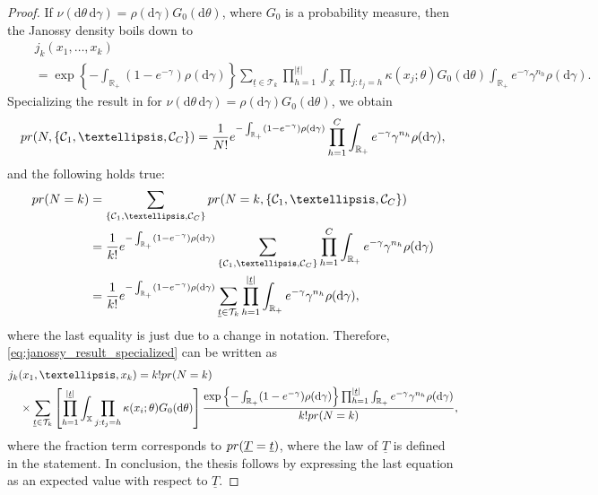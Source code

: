 \documentclass[10pt,a4paper]{amsart}
\newcommand{\R}{\mathbb{R}}
\newcommand{\X}{\mathbb{X}}
\newcommand{\calC}{\mathcal{C}}
\newcommand{\calT}{\mathcal{T}}
\newcommand{\dd}{\mathrm d}
\newcommand{\prob}{{\rm pr}}
\begin{document}
\begin{proof}
If $\nu(\dd \theta\, \dd \gamma) = \rho(\dd \gamma) G_0(\dd \theta)$, where $G_0$ is a probability measure, then the Janossy density boils down to
\begin{equation}\label{eq:janossy_result_specialized}
\begin{split}
 & j_k(x_1,\ldots,x_k) \\
 \quad & = \exp\left\{ - \int_{\R_+} ( 1 - e^{-\gamma}) \rho(\dd \gamma) \right\} \sum_{\underline{t} \in \calT_k} \prod_{h=1}^{|\underline{t}|} \int_{\X} \prod_{j: t_j = h} \kappa(x_j ; \theta) G_0(\dd \theta) \int_{\R_+} e^{-\gamma} \gamma^{n_h} \rho(\dd \gamma).  
\end{split}
\end{equation}
Specializing the result in  for $\nu(\dd \theta\, \dd \gamma) = \rho(\dd \gamma) G_0(\dd \theta) $, we obtain
\[
\prob(N, \{\calC_1,\ldots, \calC_C\}) = \frac{1}{N!} e^{- \int_{\R_+}(1-e^{-\gamma}) \rho(\dd \gamma)} \prod_{h = 1}^C \int_{\R_+} e^{-\gamma} \gamma^{n_h} \rho(\dd \gamma), 
\]
and the following holds true:
\begin{equation*}
\begin{aligned}
    \prob(N = k) &= \sum_{\{\calC_1,\ldots,\calC_C\}} \prob(N = k, \{\calC_1,\ldots, \calC_C\})\\
    &= \frac{1}{k!} e^{- \int_{\R_+}(1-e^{-\gamma}) \rho(\dd \gamma)} \sum_{\{\calC_1,\ldots,\calC_C\}} \prod_{h = 1}^C \int_{\R_+} e^{-\gamma} \gamma^{n_h} \rho(\dd \gamma)\\
    &= \frac{1}{k!} e^{- \int_{\R_+}(1-e^{-\gamma}) \rho(\dd \gamma)} \sum_{\underline{t} \in \calT_k} \prod_{h = 1}^{|\underline{t}|} \int_{\R_+} e^{-\gamma} \gamma^{n_h} \rho(\dd \gamma),
\end{aligned}
\end{equation*}
where the last equality is just due to a change in notation. Therefore, \eqref{eq:janossy_result_specialized} can be written as
\begin{equation*}
\begin{aligned}
 &  j_k(x_1,\ldots,x_k) =  k!\prob(N=k) \\
    &\quad \times \sum_{\underline{t} \in \calT_k} \left[ \prod_{h=1}^{|\underline{t}|} \int_{\X} \prod_{j: t_j = h} \kappa(x_i ; \theta) G_0(\dd \theta)\right] \frac{\exp\left\{ - \int_{\R_+} ( 1 - e^{-\gamma}) \rho(\dd \gamma) \right\} \prod_{h=1}^{|\underline{t}|}  \int_{\R_+} e^{-\gamma} \gamma^{n_h} \rho(\dd \gamma)}{k!\prob(N=k)},  
\end{aligned}
\end{equation*}
where the fraction term corresponds to $\prob(\underline{T}= \underline{t})$, where the law of $\underline{T}$ is defined in the statement. In conclusion, the thesis follows by expressing the last equation as an expected value with respect to $\underline{T}$.
\end{proof}
\end{document}
